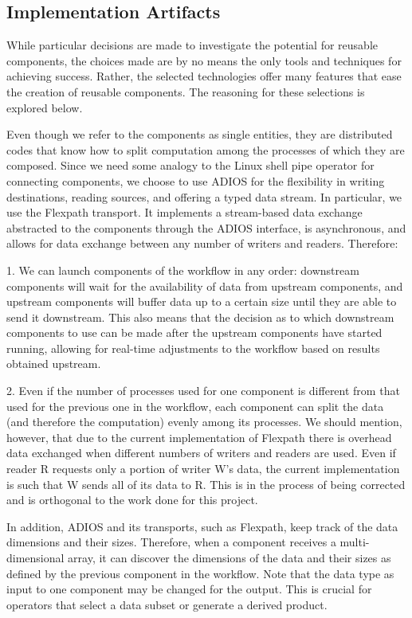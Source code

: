 \documentclass[conference]{IEEEtran}
\begin{document}
\subsection{Implementation Artifacts}

While particular decisions are made to investigate the potential for reusable
components, the choices made are by no means the only tools and techniques for
achieving success. Rather, the selected technologies offer many features that
ease the creation of reusable components. The reasoning for these selections is
explored below.

Even though we refer to the components as single entities, they are distributed
codes that know how to split computation among the processes of which they are
composed. Since we need some analogy to the Linux shell pipe operator for
connecting components, we choose to use ADIOS for the flexibility in writing
destinations, reading sources, and offering a typed data stream. In particular,
we use the Flexpath transport. It implements a stream-based data exchange
abstracted to the components through the ADIOS interface, is asynchronous, and
allows for data exchange between any number of writers and readers. Therefore:

1. We can launch components of the workflow in any order: downstream components
will wait for the availability of data from upstream components, and upstream
components will buffer data up to a certain size until they are able to send it
downstream. This also means that the decision as to which downstream
components to use can be made after the upstream components have started
running, allowing for real-time adjustments to the workflow based on results
obtained upstream.

2. Even if the number of processes used for one component is different from that
used for the previous one in the workflow, each component can split the data
(and therefore the computation) evenly among its processes. We should mention,
however, that due to the current implementation of Flexpath there is overhead
data exchanged when different numbers of writers and readers are used. Even if
reader R requests only a portion of writer W’s data, the current implementation
is such that W sends all of its data to R. This is in the process of being
corrected and is orthogonal to the work done for this project.

In addition, ADIOS and its transports, such as Flexpath, keep track of the
data dimensions and their sizes. Therefore, when a component receives a
multi-dimensional array, it can discover the dimensions of the data and their
sizes as defined by the previous component in the workflow. Note that the
data type as input to one component may be changed for the output. This is
crucial for operators that select a data subset or generate a derived product.
\end{document}
